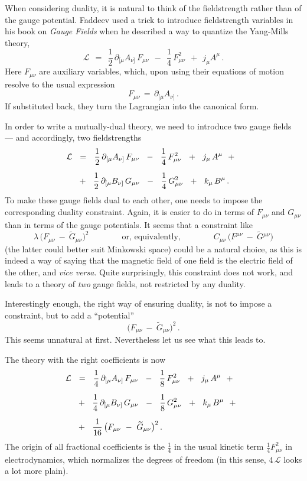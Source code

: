 \documentclass[epsfig,12pt]{article}
\def\beq{\begin{equation}}
\def\eeq{\end{equation}}
\newcommand{\cell}{{\mathcal L}}
\newcommand{\p}{\partial}
\newcommand{\wt}{\widetilde}
\begin{document}
	When considering duality, it is natural to think of the fieldstrength rather than of the gauge potential.
	Faddeev used a trick to introduce fieldstrength variables in his book on {\it Gauge Fields} when he
	described a way to quantize the Yang-Mills theory, 
\beq
\label{QED}
	\cell    ~~=~~    \frac{1}{2}\, \p_{[\mu} A_{\nu]}\, F_{\mu\nu}  ~~-~~  \frac{1}{4}\, F_{\mu\nu}^2  ~~+~~ j_\mu A^\mu\,.
\eeq
	Here $ F_{\mu\nu} $ are auxiliary variables, which, upon using their equations of motion resolve to
	the usual expression 
\[
	F_{\mu\nu} \,=\, \p_{[\mu}A_{\nu]}\,.
\]
	If substituted back, they turn the Lagrangian into the canonical form.
	
	In order to write a mutually-dual theory, we need to introduce two gauge fields --- and accordingly, two fieldstrengths
\begin{align}
%
\notag
	\cell    & ~~=~~    \frac{1}{2}\, \p_{[\mu} A_{\nu]}\, F_{\mu\nu}  ~~-~~  \frac{1}{4}\, F_{\mu\nu}^2  ~~+~~ j_\mu\, A^\mu  ~~+~~
	\\[2mm]
%
	&
		   ~~+~~    \frac{1}{2}\, \p_{[\mu} B_{\nu]}\, G_{\mu\nu}  ~~-~~  \frac{1}{4}\, G_{\mu\nu}^2  ~~+~~ k_\mu\, B^\mu\,.
\end{align}
	To make these gauge fields dual to each other, one needs to impose the corresponding duality constraint.
	Again, it is easier to do in terms of $ F_{\mu\nu} $ and $ G_{\mu\nu} $ than in terms of the gauge potentials.
	It seems that a constraint like
\[
	\lambda\, \big( F_{\mu\nu} ~-~ \wt G{}_{\mu\nu} \big)^2
	\qquad\qquad \text{or, equivalently,} \qquad\qquad
	C_{\mu\nu}\, \big( F^{\mu\nu} ~-~ \wt G{}^{\mu\nu} \big)
\]
	(the latter could better suit Minkowski space) could be a natural choice,
	as this is indeed a way of saying that the magnetic field of one field is the electric field of the other,
	and {\it vice versa}.
	Quite surprisingly, this constraint does not work, and leads to a theory of {\it two} gauge fields, not restricted by any duality.

	Interestingly enough, the right way of ensuring duality, is not to impose a constraint, but to add a ``potential''
\[
	\big( F_{\mu\nu} ~-~ \wt G{}_{\mu\nu} \big)^2\,.
\]
	This seems unnatural at first.
	Nevertheless let us see what this leads to.

	The theory with the right coefficients is now
\begin{align}
%
\notag
	\cell    & ~~=~~    \frac{1}{4}\, \p_{[\mu} A_{\nu]}\, F_{\mu\nu}  ~~-~~  \frac{1}{8}\, F_{\mu\nu}^2  ~~+~~  j_\mu\, A^\mu  ~~+~~
	\\[2mm]
%
\label{action}
	&
		   ~~+~~    \frac{1}{4}\, \p_{[\mu} B_{\nu]}\, G_{\mu\nu}  ~~-~~  \frac{1}{8}\, G_{\mu\nu}^2  ~~+~~  k_\mu\, B^\mu  ~~+~~
	\\[2mm]
%
\notag
	&
	           ~~+~~    \frac{1}{16}\, \big( F_{\mu\nu} ~-~ \wt G{}_{\mu\nu} \big)^2\,.
\end{align}
	The origin of all fractional coefficients is the $ \frac{1}{4} $ in the usual kinetic term $ \frac{1}{4} F_{\mu\nu}^2 $ 
	in electrodynamics, which normalizes the degrees of freedom (in this sense, $ 4\, \cell $ looks a lot more plain).
\end{document}
